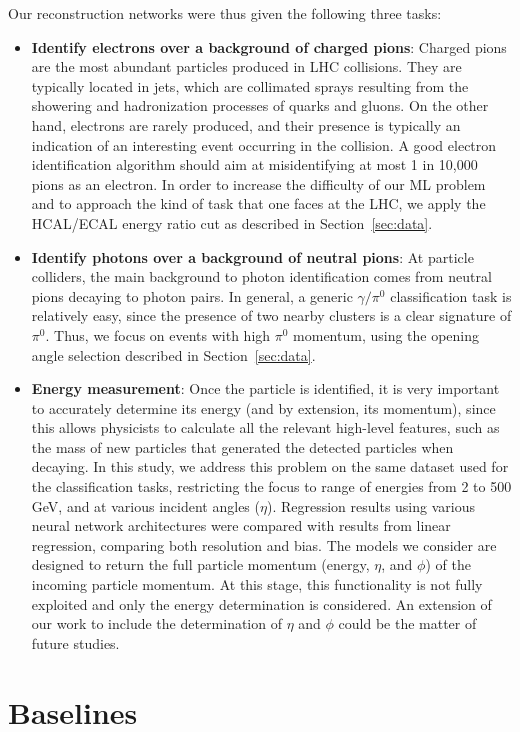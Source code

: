 Our reconstruction networks were thus given the following three tasks:
\begin{itemize}
\item {\bf Identify electrons over a background of charged pions}: Charged pions are the most abundant particles produced in LHC collisions. They are typically located in jets, which are collimated sprays resulting from the showering and hadronization processes of quarks and gluons. On the other hand, electrons are rarely produced, and their presence is typically an indication of an interesting event occurring in the collision. A good electron identification algorithm should aim at misidentifying at most 1 in 10,000 pions as an electron. In order to increase the difficulty of our ML problem and to approach the kind of task that one faces at the LHC, we apply the HCAL/ECAL energy ratio cut as described in Section~\ref{sec:data}.
\item {\bf Identify photons over a background of neutral pions}: At particle colliders, the main background to photon identification comes from neutral pions decaying to photon pairs. In general, a generic $\gamma/\pi^0$ classification task is relatively easy, since the presence of two nearby clusters is a clear signature of $\pi^0$. Thus, we focus on events with high $\pi^0$ momentum, using the opening angle selection described in Section~\ref{sec:data}.
\item {\bf Energy measurement}: Once the particle is identified, it is very important to accurately determine its energy (and by extension, its momentum), since this allows physicists to calculate all the relevant high-level features, such as the mass of new particles that generated the detected particles when decaying. In this study, we address this problem on the same dataset used for the classification tasks, restricting the focus to range of energies from 2 to 500 GeV, and at various incident angles ($\eta$). Regression results using various neural network architectures were compared with results from linear regression, comparing both resolution and bias. The models we consider are designed to return the full particle momentum (energy, $\eta$, and $\phi$) of the incoming particle momentum. At this stage, this functionality is not fully exploited and only the energy determination is considered. An extension of our work to include the determination of $\eta$ and $\phi$ could be the matter of future studies.
\end{itemize}

\section{Baselines}

